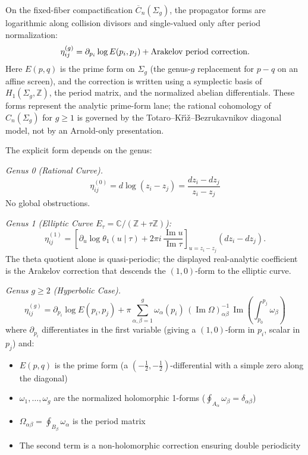 \begin{definition}
\label{def:higher-genus-log-forms}
On the fixed-fiber compactification $\overline{C}_n(\Sigma_g)$, the
propagator forms are logarithmic along collision divisors and
single-valued only after period normalization:
\begin{equation}
\eta_{ij}^{(g)}
= \partial_{p_i}\log E(p_i,p_j)
+ \textup{Arakelov period correction}.
\end{equation}
Here $E(p,q)$ is the prime form on $\Sigma_g$ (the genus-$g$
replacement for $p-q$ on an affine screen), and the correction is
written using a symplectic basis of $H_1(\Sigma_g,\mathbb Z)$, the
period matrix, and the normalized abelian differentials. These forms
represent the analytic prime-form lane; the rational cohomology of
$C_n(\Sigma_g)$ for $g\ge1$ is governed by the
Totaro--K\v{r}\'{\i}\v{z}--Bezrukavnikov diagonal model, not by an
Arnold-only presentation.
\end{definition}

The explicit form depends on the genus:

\emph{Genus 0 (Rational Curve).}
\begin{equation}
\eta_{ij}^{(0)} = d\log(z_i - z_j) = \frac{dz_i - dz_j}{z_i - z_j}
\end{equation}
No global obstructions.

\emph{Genus 1 (Elliptic Curve $E_\tau = \mathbb{C}/(\mathbb{Z} + \tau\mathbb{Z})$):}
\begin{equation}
\eta_{ij}^{(1)}
=
\left[
\partial_u\log\theta_1(u\mid\tau)
+2\pi i\,\frac{\operatorname{Im}u}{\operatorname{Im}\tau}
\right]_{u=z_i-z_j}
(dz_i-dz_j).
\end{equation}
The theta quotient alone is quasi-periodic; the displayed
real-analytic coefficient is the Arakelov correction that descends the
$(1,0)$-form to the elliptic curve.

\emph{Genus $g \geq 2$ (Hyperbolic Case).}
\begin{equation}
\eta_{ij}^{(g)} = \partial_{p_i}\log E(p_i, p_j) + \pi\sum_{\alpha, \beta = 1}^g \omega_\alpha(p_i) \,(\operatorname{Im}\Omega)_{\alpha\beta}^{-1}\, \operatorname{Im}\!\left(\int_{p_0}^{p_j}\omega_\beta\right)
\end{equation}
where $\partial_{p_i}$ differentiates in the first variable (giving a $(1,0)$-form in $p_i$, scalar in $p_j$) and:
\begin{itemize}
\item $E(p, q)$ is the prime form (a $(-\frac{1}{2}, -\frac{1}{2})$-differential with a simple zero along the diagonal)
\item $\omega_1, \ldots, \omega_g$ are the normalized holomorphic 1-forms ($\oint_{A_\alpha}\omega_\beta = \delta_{\alpha\beta}$)
\item $\Omega_{\alpha\beta} = \oint_{B_\beta} \omega_\alpha$ is the period matrix
\item The second term is a non-holomorphic correction ensuring double periodicity
\end{itemize}

